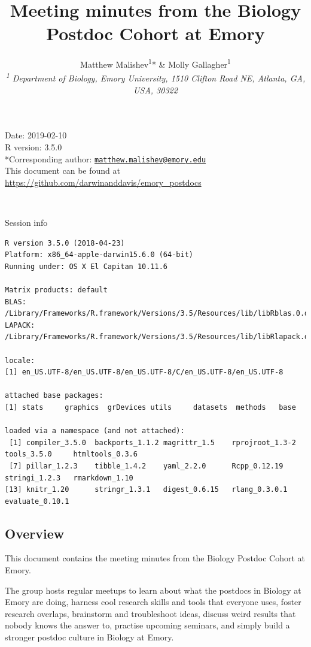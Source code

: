 \documentclass[10,portrait]{article}
\title{Meeting minutes from the Biology Postdoc Cohort at Emory}
\author{Matthew Malishev\textsuperscript{1}* \& Molly
Gallagher\textsuperscript{1}\\[2\baselineskip]\emph{\textsuperscript{1}
Department of Biology, Emory University, 1510 Clifton Road NE, Atlanta,
GA, USA, 30322}}
\date{}
\begin{document}
\maketitle

{
\hypersetup{linkcolor=black}
\setcounter{tocdepth}{2}
\tableofcontents
}
\newpage   

Date: 2019-02-10\\
R version: 3.5.0\\
*Corresponding author:
\href{mailto:matthew.malishev@emory.edu}{\nolinkurl{matthew.malishev@emory.edu}}\\
This document can be found at
\url{https://github.com/darwinanddavis/emory_postdocs}

~

Session info

\begin{verbatim}
R version 3.5.0 (2018-04-23)
Platform: x86_64-apple-darwin15.6.0 (64-bit)
Running under: OS X El Capitan 10.11.6

Matrix products: default
BLAS: /Library/Frameworks/R.framework/Versions/3.5/Resources/lib/libRblas.0.dylib
LAPACK: /Library/Frameworks/R.framework/Versions/3.5/Resources/lib/libRlapack.dylib

locale:
[1] en_US.UTF-8/en_US.UTF-8/en_US.UTF-8/C/en_US.UTF-8/en_US.UTF-8

attached base packages:
[1] stats     graphics  grDevices utils     datasets  methods   base     

loaded via a namespace (and not attached):
 [1] compiler_3.5.0  backports_1.1.2 magrittr_1.5    rprojroot_1.3-2 tools_3.5.0     htmltools_0.3.6
 [7] pillar_1.2.3    tibble_1.4.2    yaml_2.2.0      Rcpp_0.12.19    stringi_1.2.3   rmarkdown_1.10 
[13] knitr_1.20      stringr_1.3.1   digest_0.6.15   rlang_0.3.0.1   evaluate_0.10.1
\end{verbatim}

\newpage  

\subsection{Overview}\label{overview}

This document contains the meeting minutes from the Biology Postdoc
Cohort at Emory.

The group hosts regular meetups to learn about what the postdocs in
Biology at Emory are doing, harness cool research skills and tools that
everyone uses, foster research overlaps, brainstorm and troubleshoot
ideas, discuss weird results that nobody knows the answer to, practise
upcoming seminars, and simply build a stronger postdoc culture in
Biology at Emory.
\end{document}
